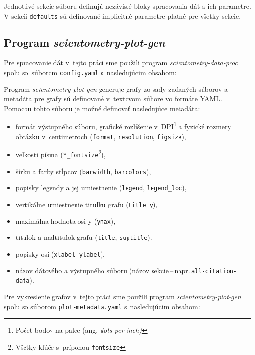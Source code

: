 Jednotlivé sekcie súboru definujú nezávislé bloky spracovania dát a ich
parametre. V sekcii \verb|defaults| sú definované implicitné parametre platné
pre všetky sekcie.

\subsection*{Program \emph{scientometry-plot-gen}}

Pre spracovanie dát v~tejto práci sme použili program
\emph{scientometry-data-proc} spolu so~súborom \verb|config.yaml|
s~nasledujúcim obsahom:



\noindent Program \emph{scientometry-plot-gen} generuje grafy zo sady zadaných súborov a
metadáta pre grafy sú definované v~textovom súbore vo formáte YAML. Pomocou tohto súboru
je možné definovať nasledujúce metadáta:
\begin{itemize}
  \item formát výstupného súboru, grafické rozlíšenie v~DPI\footnote{Počet bodov na palec (ang. \emph{dots per inch)}} a fyzické rozmery obrázku v~centimetroch (\verb|format|, \verb|resolution|, \verb|figsize|),
  \item veľkosti písma (\verb|*_fontsize|\footnote{Všetky kľúče s~príponou \texttt{fontsize}}),
  \item šírku a farby stĺpcov (\verb|barwidth|, \verb|barcolors|),
  \item popisky legendy a jej umiestnenie  (\verb|legend|, \verb|legend_loc|),
  \item vertikálne umiestnenie titulku grafu (\verb|title_y|),
  \item maximálna hodnota osi y (\verb|ymax|),
  \item titulok a nadtitulok grafu (\verb|title|, \verb|suptitle|).
  \item popisky osí (\verb|xlabel|, \verb|ylabel|).
  \item názov dátového a výstupného súboru (názov sekcie\,--\,napr.\,\verb|all-citation-data|).
\end{itemize}
Pre vykreslenie grafov v~tejto práci sme použili program
\emph{scientometry-plot-gen} spolu so súborom \verb|plot-metadata.yaml|
s~nasledujúcim obsahom:


